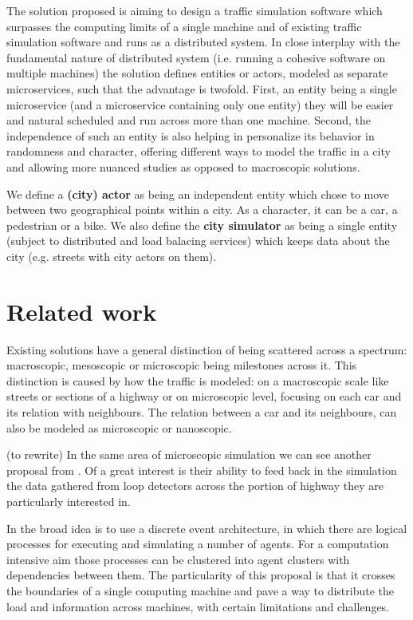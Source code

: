 \documentclass[conference]{IEEEtran}
\begin{document}
The solution proposed is aiming to design a traffic simulation software which surpasses the computing limits of a single machine and of existing traffic simulation software and runs as a distributed system. In close interplay with the fundamental nature of distributed system (i.e. running a cohesive software on multiple machines) the solution defines entities or actors, modeled as separate microservices, such that the advantage is twofold. First, an entity being a single microservice (and a microservice containing only one entity) they will be easier and natural scheduled and run across more than one machine. Second, the independence of such an entity is also helping in personalize its behavior in randomness and character, offering different ways to model the traffic in a city and allowing more nuanced studies as opposed to macroscopic solutions.

We define a \textbf{(city) actor} as being an independent entity which chose to move between two geographical points within a city. As a character, it can be a car, a pedestrian or a bike. We also define the \textbf{city simulator} as being a single entity (subject to distributed and load balacing services) which keeps data about the city (e.g. streets with city actors on them).

\section{Related work}
\label{sec:existingsolutions}

Existing solutions have a general distinction of being scattered across a spectrum: macroscopic, mesoscopic or microscopic being milestones across it. This distinction is caused by how the traffic is modeled: on a macroscopic scale like streets or sections of a highway or on microscopic level, focusing on each car and its relation with neighbours. The relation between a car and its neighbours, can also be modeled as microscopic or nanoscopic.

(to rewrite) In the same area of microscopic simulation we can see another proposal from \cite{7004985}. Of a great interest is their ability to feed back in the simulation the data gathered from loop detectors across the portion of highway they are particularly interested in.

In \cite{8569576} the broad idea is to use a discrete event architecture, in which there are logical processes for executing and simulating a number of agents. For a computation intensive aim those processes can be clustered into agent clusters with dependencies between them. The particularity of this proposal is that it crosses the boundaries of a single computing machine and pave a way to distribute the load and information across machines, with certain limitations and challenges.
\end{document}
